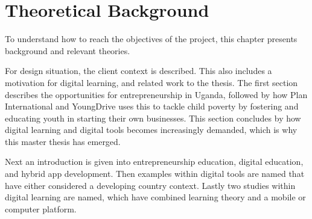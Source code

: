 %

\section{Theoretical Background}

To understand how to reach the objectives of the project, this chapter presents background and relevant theories.


For design situation, the client context is described. This also includes a motivation for digital learning, and related work to the thesis. The first section describes the opportunities for entrepreneurship in Uganda, followed by how Plan International and YoungDrive uses this to tackle child poverty by fostering and educating youth in starting their own businesses. This section concludes by how digital learning and digital tools becomes increasingly demanded, which is why this master thesis has emerged.

Next an introduction is given into entrepreneurship education, digital education, and hybrid app development. Then examples within digital tools are named that have either considered a developing country context. Lastly two studies within digital learning are named, which have combined learning theory and a mobile or computer platform.






